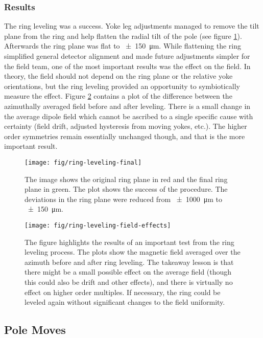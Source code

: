 \subsubsection{Results}
The ring leveling was a success.  Yoke leg adjustments managed to remove the tilt plane from the ring and help flatten the radial tilt of the pole (see figure \ref{fig:ring-leveling-final}).  Afterwards the ring plane was flat to \SI{\pm 150}{\micro\meter}.  While flattening the ring simplified general \mugmtwo detector alignment and made future adjustments simpler for the field team, one of the most important results was the effect on the field.  In theory, the field should not depend on the ring plane or the relative yoke orientations, but the ring leveling provided an opportunity to symbiotically measure the effect.  Figure \ref{fig:ring-leveling-field-effects} contains a plot of the difference between the azimuthally averaged field before and after leveling.  There is a small change in the average dipole field which cannot be ascribed to a single specific cause with certainty (field drift, adjusted hysteresis from moving yokes, etc.).  The higher order symmetries remain essentially unchanged though, and that is the more important result.

\begin{figure}
\centering
\texttt{[image: fig/ring-leveling-final]}
\caption{
    The image shows the original ring plane in red and the final ring plane in green.  The plot shows the success of the procedure.  The deviations in the ring plane were reduced from \SI{\pm 1000}{\micro \meter} to \SI{\pm 150}{\micro\meter}. 
    \label{fig:ring-leveling-final}
}
\end{figure}

\begin{figure}
\centering
\texttt{[image: fig/ring-leveling-field-effects]}
\caption{
    The figure highlights the results of an important test from the ring leveling process.  The plots show the magnetic field averaged over the azimuth before and after ring leveling.  The takeaway lesson is that there might be a small possible effect on the average field (though this could also be drift and other effects), and there is virtually no effect on higher order multiples.  If necessary, the ring could be leveled again without significant changes to the field uniformity. 
    \label{fig:ring-leveling-field-effects}
}
\end{figure}

\subsection{Pole Moves}

